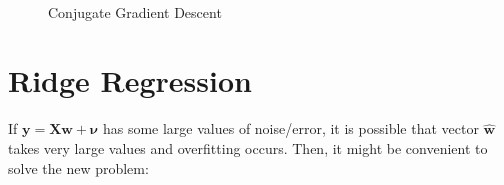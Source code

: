 \documentclass[12pt]{report}
\begin{document}
\begin{figure}[H]
\begin{center}
\\
\label{fig:conj}
\caption{Conjugate Gradient Descent}
\end{center}
\end{figure}

\pagebreak


\section{Ridge Regression \cite{MV}}
If $ \mathbf { y } = \mathbf { X } \mathbf { w } + \boldsymbol { \nu } $ has some large values of noise/error, it is possible that vector $\mathbf { \hat { w } }$ takes very large values and overfitting occurs. Then, it might be convenient to solve the new problem:
\end{document}
